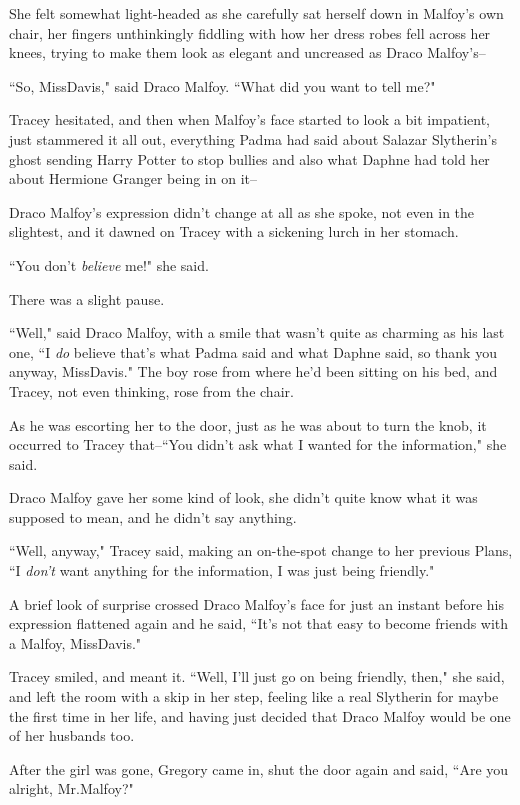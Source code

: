 She felt somewhat light-headed as she carefully sat herself down in Malfoy's own chair, her fingers unthinkingly fiddling with how her dress robes fell across her knees, trying to make them look as elegant and uncreased as Draco Malfoy's\---

``So, Miss\?Davis," said Draco Malfoy. ``What did you want to tell me?"

Tracey hesitated, and then when Malfoy's face started to look a bit impatient, just stammered it all out, everything Padma had said about Salazar Slytherin's ghost sending Harry Potter to stop bullies and also what Daphne had told her about Hermione Granger being in on it\---

Draco Malfoy's expression didn't change at all as she spoke, not even in the slightest, and it dawned on Tracey with a sickening lurch in her stomach.

``You don't \emph{believe} me!" she said.

There was a slight pause.

``Well," said Draco Malfoy, with a smile that wasn't quite as charming as his last one, ``I \emph{do} believe that's what Padma said and what Daphne said, so thank you anyway, Miss\?Davis." The boy rose from where he'd been sitting on his bed, and Tracey, not even thinking, rose from the chair.

As he was escorting her to the door, just as he was about to turn the knob, it occurred to Tracey that\---``You didn't ask what I wanted for the information," she said.

Draco Malfoy gave her some kind of look, she didn't quite know what it was supposed to mean, and he didn't say anything.

``Well, anyway," Tracey said, making an on-the-spot change to her previous Plans, ``I \emph{don't} want anything for the information, I was just being friendly."

A brief look of surprise crossed Draco Malfoy's face for just an instant before his expression flattened again and he said, ``It's not that easy to become friends with a Malfoy, Miss\?Davis."

Tracey smiled, and meant it. ``Well, I'll just go on being friendly, then," she said, and left the room with a skip in her step, feeling like a real Slytherin for maybe the first time in her life, and having just decided that Draco Malfoy would be one of her husbands too.

\later

After the girl was gone, Gregory came in, shut the door again and said, ``Are you alright, Mr.\?Malfoy?"

